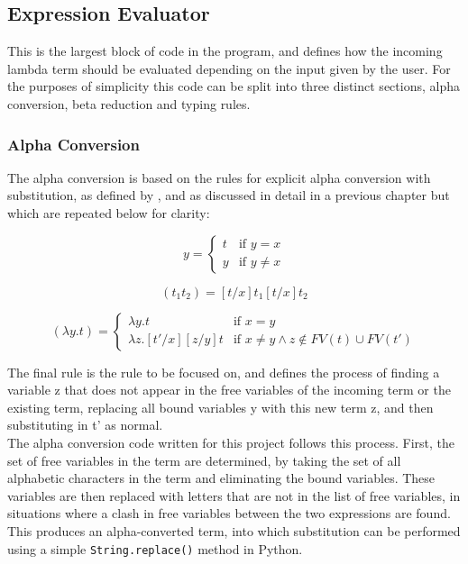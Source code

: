 \documentclass[a4paper,12pt]{report}
\begin{document}
\subsection{Expression Evaluator}
This is the largest block of code in the program, and defines how the incoming lambda term should be evaluated depending on the input given by the user. For the purposes of simplicity this code can be split into three distinct sections, alpha conversion, beta reduction and typing rules.

\subsubsection{Alpha Conversion}
The alpha conversion is based on the rules for explicit alpha conversion with substitution, as defined by \cite{Acar2008}, and as discussed in detail in a previous chapter but which are repeated below for clarity:

\begin{equation*}
[t/x]y=\begin{cases}
t & \text{if $y=x$}\\
y & \text{if $y\ne x$}
\end{cases}
\end{equation*}

\begin{equation*}
[t/x](t_1t_2)=[t/x]t_1[t/x]t_2
\end{equation*}

\begin{equation*}
[t'/x](\lambda y.t)=\begin{cases}
\lambda y.t & \text{if $x=y$}\\
\lambda z.[t'/x][z/y]t & \text{if $x\ne y \land z\notin FV(t) \cup FV(t')$}
\end{cases}
\end{equation*}

The final rule is the rule to be focused on, and defines the process of finding a variable z that does not appear in the free variables of the incoming term or the existing term, replacing all bound variables y with this new term z, and then substituting in t’ as normal.\\

The alpha conversion code written for this project follows this process. First, the set of free variables in the term are determined, by taking the set of all alphabetic characters in the term and eliminating the bound variables. These variables are then replaced with letters that are not in the list of free variables, in situations where a clash in free variables between the two expressions are found. This produces an alpha-converted term, into which substitution can be performed using a simple \texttt{String.replace()} method in Python.
\end{document}
